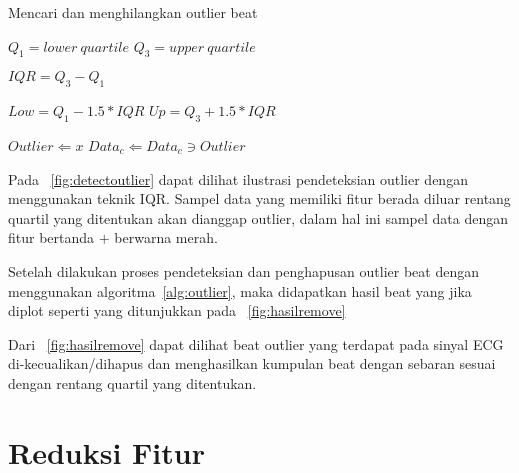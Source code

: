 \begin{algorithm}  
\caption{Mencari dan menghilangkan outlier beat}          
\label{alg:outlier}                           
\begin{algorithmic}                    %
			\STATE $Q_1 = lower\ quartile $  
			\STATE $Q_3 = upper\ quartile $ 
			
			\STATE
			\STATE $IQR = Q_3 - Q_1$ 
			
			\STATE
			\STATE {}
			\STATE $Low = Q_1 - 1.5 * IQR $ 
			\STATE $Up  = Q_3 + 1.5 * IQR $
			
			\STATE
			\STATE {}
				 	\STATE $Outlier \Leftarrow  x$ 
				\ENDIF
			\ENDFOR
		\ENDFOR
		\STATE $Data_c \Leftarrow Data_c \ni Outlier$
	\ENDFOR
\end{algorithmic}
\end{algorithm}

Pada \pic~\ref{fig:detectoutlier}  dapat dilihat ilustrasi pendeteksian outlier
dengan menggunakan teknik IQR. Sampel data yang memiliki fitur berada diluar
rentang quartil yang ditentukan akan dianggap outlier, dalam hal ini sampel data
dengan fitur bertanda $+$ berwarna merah.

Setelah dilakukan proses pendeteksian dan penghapusan outlier beat dengan
menggunakan algoritma~\ref{alg:outlier}, maka didapatkan hasil beat yang jika
diplot seperti yang ditunjukkan pada \pic~\ref{fig:hasilremove}


Dari \pic~\ref{fig:hasilremove} dapat dilihat beat outlier yang terdapat pada
sinyal ECG di-kecualikan/dihapus dan menghasilkan kumpulan beat dengan sebaran
sesuai dengan rentang quartil yang ditentukan.

\section{Reduksi Fitur}


